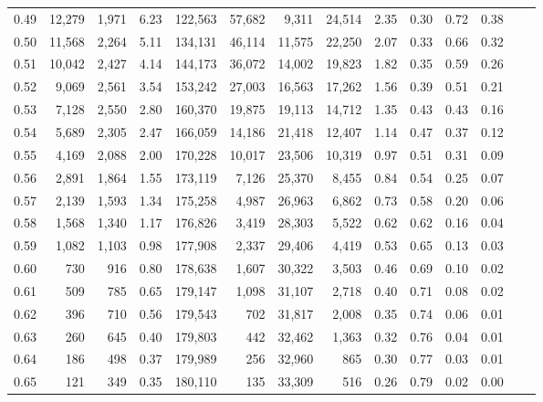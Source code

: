 \begin{tabular}{rrrrrrrrrrrrrr}
0.49 &  12,279 &  1,971 &    6.23 &  122,563 &   57,682 &   9,311 &  24,514 &  2.35 &  0.30 &  0.72 &      0.38 \\
0.50 &  11,568 &  2,264 &    5.11 &  134,131 &   46,114 &  11,575 &  22,250 &  2.07 &  0.33 &  0.66 &      0.32 \\
0.51 &  10,042 &  2,427 &    4.14 &  144,173 &   36,072 &  14,002 &  19,823 &  1.82 &  0.35 &  0.59 &      0.26 \\
0.52 &   9,069 &  2,561 &    3.54 &  153,242 &   27,003 &  16,563 &  17,262 &  1.56 &  0.39 &  0.51 &      0.21 \\
0.53 &   7,128 &  2,550 &    2.80 &  160,370 &   19,875 &  19,113 &  14,712 &  1.35 &  0.43 &  0.43 &      0.16 \\
0.54 &   5,689 &  2,305 &    2.47 &  166,059 &   14,186 &  21,418 &  12,407 &  1.14 &  0.47 &  0.37 &      0.12 \\
0.55 &   4,169 &  2,088 &    2.00 &  170,228 &   10,017 &  23,506 &  10,319 &  0.97 &  0.51 &  0.31 &      0.09 \\
0.56 &   2,891 &  1,864 &    1.55 &  173,119 &    7,126 &  25,370 &   8,455 &  0.84 &  0.54 &  0.25 &      0.07 \\
0.57 &   2,139 &  1,593 &    1.34 &  175,258 &    4,987 &  26,963 &   6,862 &  0.73 &  0.58 &  0.20 &      0.06 \\
0.58 &   1,568 &  1,340 &    1.17 &  176,826 &    3,419 &  28,303 &   5,522 &  0.62 &  0.62 &  0.16 &      0.04 \\
0.59 &   1,082 &  1,103 &    0.98 &  177,908 &    2,337 &  29,406 &   4,419 &  0.53 &  0.65 &  0.13 &      0.03 \\
0.60 &     730 &    916 &    0.80 &  178,638 &    1,607 &  30,322 &   3,503 &  0.46 &  0.69 &  0.10 &      0.02 \\
0.61 &     509 &    785 &    0.65 &  179,147 &    1,098 &  31,107 &   2,718 &  0.40 &  0.71 &  0.08 &      0.02 \\
0.62 &     396 &    710 &    0.56 &  179,543 &      702 &  31,817 &   2,008 &  0.35 &  0.74 &  0.06 &      0.01 \\
0.63 &     260 &    645 &    0.40 &  179,803 &      442 &  32,462 &   1,363 &  0.32 &  0.76 &  0.04 &      0.01 \\
0.64 &     186 &    498 &    0.37 &  179,989 &      256 &  32,960 &     865 &  0.30 &  0.77 &  0.03 &      0.01 \\
0.65 &     121 &    349 &    0.35 &  180,110 &      135 &  33,309 &     516 &  0.26 &  0.79 &  0.02 &      0.00 \\

\end{tabular}
